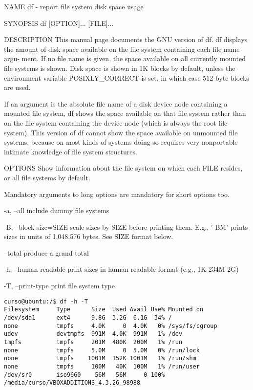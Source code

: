 \documentclass[a4paper,11pt,spanish]{article} %
\newenvironment{myscriptlisting}
{\begin{list}{}{\setlength{\leftmargin}{1em}}\item\scriptsize\bfseries}
{\end{list}}
\begin{document}
NAME
       df - report file system disk space usage

SYNOPSIS
       df [OPTION]... [FILE]...

DESCRIPTION
       This  manual page documents the GNU version of df.  df displays the amount of 
       disk space available on the file system containing each file name argu‐
       ment.  If no file name is given, the space available on all currently mounted 
       file systems is shown.  Disk space is shown in 1K  blocks  by  default,
       unless the environment variable POSIXLY\_CORRECT is set, in which case 512-byte
       blocks are used.

       If  an  argument  is  the absolute file name of a disk device node containing a
       mounted file system, df shows the space available on that file system
       rather than on the file system containing the device node (which is always the
       root file system).  This version of df cannot show the space available
       on unmounted file systems, because on most kinds of systems doing so requires
       very nonportable intimate knowledge of file system structures.

OPTIONS
       Show information about the file system on which each FILE resides, or all
       file systems by default.

       Mandatory arguments to long options are mandatory for short options too.

       -a, --all
              include dummy file systems

       -B, --block-size=SIZE
              scale sizes by SIZE before printing them.  E.g., '-BM' prints sizes in units
              of 1,048,576 bytes.  See SIZE format below.

       --total
              produce a grand total

       -h, --human-readable
              print sizes in human readable format (e.g., 1K 234M 2G)

       -T, --print-type
              print file system type
                           
\begin{myscriptlisting}
 \begin{verbatim}
curso@ubuntu:/$ df -h -T
Filesystem     Type      Size  Used Avail Use% Mounted on
/dev/sda1      ext4      9.8G  3.2G  6.1G  34% /
none           tmpfs     4.0K     0  4.0K   0% /sys/fs/cgroup
udev           devtmpfs  991M  4.0K  991M   1% /dev
tmpfs          tmpfs     201M  480K  200M   1% /run
none           tmpfs     5.0M     0  5.0M   0% /run/lock
none           tmpfs    1001M  152K 1001M   1% /run/shm
none           tmpfs     100M   40K  100M   1% /run/user
/dev/sr0       iso9660    56M   56M     0 100% /media/curso/VBOXADDITIONS_4.3.26_98988
 \end{verbatim}
\end{myscriptlisting}
\end{document}
